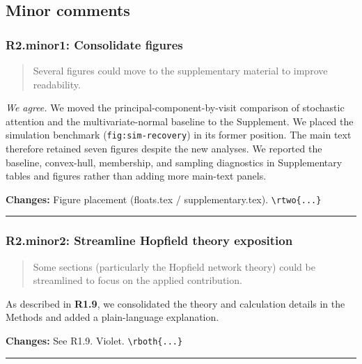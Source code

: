 \documentclass[
  11pt,
  letterpaper,
]{article}
\begin{document}
\subsection{Minor comments}\label{minor-comments-1}

\subsubsection{R2.minor1: Consolidate figures}\label{r2minor1-consolidate-figures}

\begin{quote}
Several figures could move to the supplementary material to improve readability.
\end{quote}

\emph{We agree.} We moved the principal-component-by-visit comparison of stochastic attention and the multivariate-normal baseline to the Supplement. We placed the simulation benchmark (\texttt{fig:sim-recovery}) in its former position. The main text therefore retained seven figures despite the new analyses. We reported the baseline, convex-hull, membership, and sampling diagnostics in Supplementary tables and figures rather than adding more main-text panels.

\textbf{Changes:} Figure placement (floats.tex / supplementary.tex). \texttt{\textbackslash{}rtwo\{...\}}

\begin{center}\rule{0.5\linewidth}{0.5pt}\end{center}

\subsubsection{R2.minor2: Streamline Hopfield theory exposition}\label{r2minor2-streamline-hopfield-theory-exposition}

\begin{quote}
Some sections (particularly the Hopfield network theory) could be streamlined to focus on the applied contribution.
\end{quote}

As described in \textbf{R1.9}, we consolidated the theory and calculation details in the Methods and added a plain-language explanation.

\textbf{Changes:} See R1.9. Violet. \texttt{\textbackslash{}rboth\{...\}}

\begin{center}\rule{0.5\linewidth}{0.5pt}\end{center}
\end{document}

